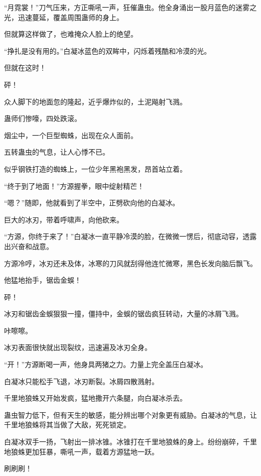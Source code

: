 
\begin{this_body}

“月霓裳！”刀气压来，方正嘶吼一声，狂催蛊虫。他全身涌出一股月蓝色的迷雾之光，迅速蔓延，覆盖周围蛊师的身上。

但就算这样做了，也难掩众人脸上的绝望。

“挣扎是没有用的。”白凝冰蓝色的双眸中，闪烁着残酷和冷漠的光。

但就在这时！

砰！

众人脚下的地面忽的隆起，近乎爆炸似的，土泥飚射飞溅。

蛊师们惨嚎，四处跌滚。

烟尘中，一个巨型蜘蛛，出现在众人面前。

五转蛊虫的气息，让人心悸不已。

似乎钢铁打造的蜘蛛上，一位少年黑袍黑发，昂首站立着。

“终于到了地面！”方源握拳，眼中绽射精芒！

“嗯？”随即，他就看到了半空中，正劈砍向他的白凝冰。

巨大的冰刃，带着呼啸声，向他砍来。

“方源，你终于来了！”白凝冰一直平静冷漠的脸，在微微一愣后，彻底动容，透露出兴奋和战意。

方源冷哼，冰刃还未及体，冰寒的刀风就刮得他连忙微寒，黑色长发向脑后飘飞。

他猛地抬手，锯齿金蜈！

砰！

冰刃和锯齿金蜈狠狠一撞，僵持中，金蜈的锯齿疯狂转动，大量的冰屑飞溅。

咔嚓嚓。

冰刃表面很快就出现裂纹，迅速遍及冰刃全身。

“开！”方源断喝一声，他身具两猪之力。力量上完全盖压白凝冰。

白凝冰只能松手飞退，冰刃断裂。冰屑四散溅射。

千里地狼蛛又开始发疯，猛地撒开六条腿，向白凝冰杀去。

蛊虫智力低下，但有天生的敏感，能分辨出哪个对象更有威胁。白凝冰的气息，让千里地狼蛛将其当做了大敌，死死锁定。

白凝冰双手一扬，飞射出一排冰锥。冰锥打在千里地狼蛛的身上。纷纷崩碎，千里地狼蛛更加狂暴，嘶吼一声，载着方源猛地一跃。

刷刷刷！


\end{this_body}
